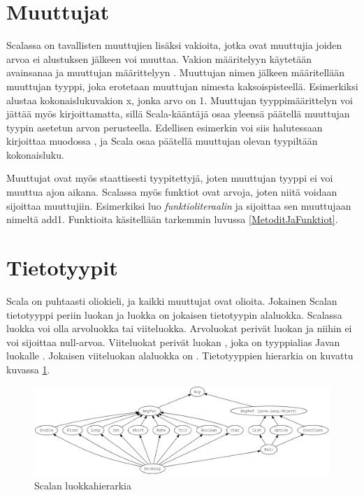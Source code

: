 \section{Muuttujat} \label{Muuttujat}
Scalassa on tavallisten muuttujien lisäksi vakioita, jotka ovat muuttujia joiden arvoa ei alustuksen jälkeen voi muuttaa. Vakion määritelyyn käytetään avainsanaa  ja muuttujan määrittelyyn . Muuttujan nimen jälkeen määritellään muuttujan tyyppi, joka erotetaan muuttujan nimesta kaksoispisteellä. Esimerkiksi  alustaa kokonaislukuvakion x, jonka arvo on 1. Muuttujan tyyppimäärittelyn voi jättää myös kirjoittamatta, sillä Scala-kääntäjä osaa yleensä päätellä muuttujan tyypin asetetun arvon perusteella. Edellisen esimerkin voi siis halutessaan kirjoittaa muodossa , ja Scala osaa päätellä muuttujan olevan tyypiltään kokonaisluku.
\cite[Basics]{tourOfScala}

Muuttujat ovat myös staattisesti tyypitettyjä, joten muuttujan tyyppi ei voi muuttua ajon aikana. Scalassa myös funktiot ovat arvoja, joten niitä voidaan sijoittaa muuttujiin. Esimerkiksi  luo \textit{funktioliteraalin} ja sijoittaa sen muuttujaan nimeltä add1. Funktioita käsitellään tarkemmin luvussa \ref{MetoditJaFunktiot}.
\cite[Luku 1]{prorgrammingInScala3rd}


\section{Tietotyypit}
Scala on puhtaasti oliokieli, ja kaikki muuttujat ovat olioita. Jokainen Scalan tietotyyppi periin luokan  ja luokka  on jokaisen tietotyypin alaluokka. Scalassa luokka voi olla arvoluokka tai viiteluokka. Arvoluokat perivät luokan  ja niihin ei voi sijoittaa null-arvoa. Viiteluokat perivät luokan , joka on tyyppialias Javan luokalle . Jokaisen viiteluokan alaluokka on . Tietotyyppien hierarkia on kuvattu kuvassa \ref{tyyppihierarkia}.
\cite[Luku 5]{prorgrammingInScala3rd}

\begin{figure}
    \centering \includegraphics[width=1\textwidth]{kuvat/typehierarchy}
    \caption{Scalan luokkahierarkia}
    \label{tyyppihierarkia}
\end{figure}

